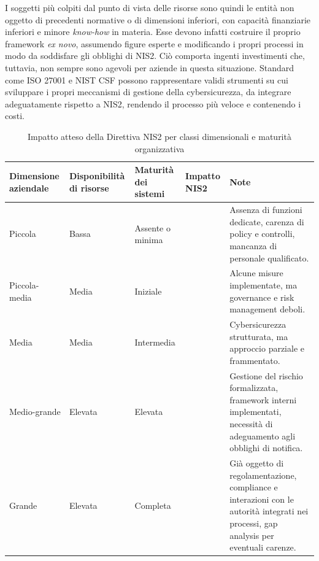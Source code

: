 I soggetti più colpiti dal punto di vista delle risorse sono quindi le entità non oggetto di precedenti normative
o di dimensioni inferiori, con capacità finanziarie inferiori e minore \textit{know-how} in materia. Esse devono
infatti costruire il proprio framework \textit{ex novo}, assumendo figure esperte e modificando i propri processi
in modo da soddisfare gli obblighi di NIS2. Ciò comporta ingenti investimenti che, tuttavia, non sempre sono agevoli
per aziende in questa situazione. Standard come ISO 27001 e NIST CSF possono rappresentare validi strumenti su cui
sviluppare i propri meccanismi di gestione della cybersicurezza, da integrare adeguatamente rispetto a NIS2, 
rendendo il processo più veloce e contenendo i costi.

\begin{table}[H]
    \centering
    \setlength{\tabcolsep}{5pt}
    \renewcommand\arraystretch{1.1}
    \begin{tabularx}{\textwidth}{|>{\raggedright\arraybackslash}p{}|>{\raggedright\arraybackslash}p{}|>{\raggedright\arraybackslash}p{}|>{\raggedright\arraybackslash}p{}|>{\raggedright\arraybackslash}X|}
    \hline
        \rowcolor{gray!20}
        \textbf{Dimensione aziendale} & \textbf{Disponibilità di risorse} & \textbf{Maturità dei sistemi} & \textbf{Impatto NIS2} & \textbf{Note} \\ \hline
        Piccola & Bassa & Assente o minima & \cellcolor{red!25}{Molto elevato} & \small{Assenza di funzioni dedicate, carenza di policy e controlli, mancanza di personale qualificato.} \\ \hline
        Piccola-media & Media & Iniziale & \cellcolor{red!15}{Elevato} & \small{Alcune misure implementate, ma governance e risk management deboli.} \\ \hline
        Media & Media & Intermedia & \cellcolor{yellow!20}{Medio} & \small{Cybersicurezza strutturata, ma approccio parziale e frammentato.} \\ \hline
        Medio-grande & Elevata & Elevata & \cellcolor{green!15}{Basso} & \small{Gestione del rischio formalizzata, framework interni implementati, necessità di adeguamento agli obblighi di notifica.} \\ \hline
        Grande & Elevata & Completa & \cellcolor{green!25}{Molto basso} & \small{Già oggetto di regolamentazione, compliance e interazioni con le autorità integrati nei processi, gap analysis per eventuali carenze.} \\ \hline
    \end{tabularx}
    \vspace{0.6\baselineskip}
    \caption{Impatto atteso della Direttiva NIS2 per classi dimensionali e maturità organizzativa}
    \label{tab:impatto-nis2}
\end{table}

